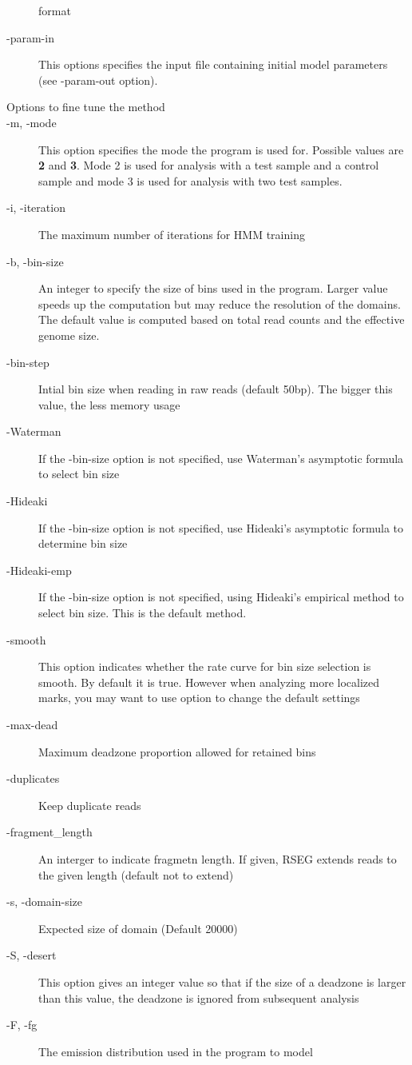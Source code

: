 \documentclass[11pt]{report}
\begin{document}
\begin{description}
  format
\item[-param-in] This options specifies the input file containing initial model
  parameters (see -param-out option).
\item[Options to fine tune the method]
\item[-m, -mode] This option specifies the mode the program is used
  for. Possible values are \textbf{2} and \textbf{3}. Mode 2 is used
  for analysis with a test sample and a control sample and mode 3 is
  used for analysis with two test samples.
\item[-i, -iteration] The maximum number of iterations for HMM
  training
\item[-b, -bin-size] An integer to specify the size of bins used in
  the program. Larger value speeds up the computation but may reduce
  the resolution of the domains. The default value is computed based
  on total read counts and the effective genome size.
\item[-bin-step] Intial bin size when reading in raw reads
  (default 50bp). The bigger this value, the less memory usage
\item[-Waterman] If the -bin-size option is not specified, use
  Waterman's asymptotic formula to select bin size
\item[-Hideaki] If the -bin-size option is not specified, use
  Hideaki's asymptotic formula to determine bin size
\item[-Hideaki-emp] If the -bin-size option is not specified, using
  Hideaki's empirical method to select bin size. This is the default
  method.
\item[-smooth] This option indicates whether the rate curve for bin
  size selection is smooth. By default it is true. However when
  analyzing more localized marks, you may want to use option to change
  the default settings
\item[-max-dead] Maximum deadzone proportion allowed for retained bins
\item[-duplicates] Keep duplicate reads
 \item[-fragment\_length] An interger to indicate fragmetn length. If given,
   RSEG extends reads to the given length (default not to extend)
\item[-s, -domain-size] Expected size of domain (Default 20000) 
\item[-S, -desert] This option gives an integer value so that if
  the size of a deadzone is larger than this value, the deadzone is
  ignored from subsequent analysis
\item[-F, -fg] The emission distribution used in the program to model

\end{description}
\end{document}
